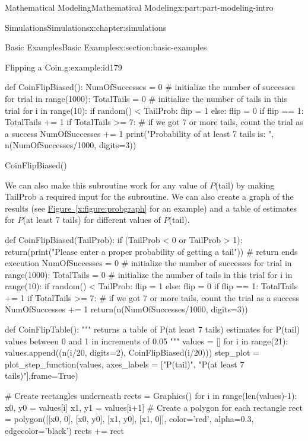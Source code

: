 \documentclass[oneside,10pt,]{book}
\newcommand{\xreffont}{\relax}
\numberwithin{equation}{section}
\begin{document}
\begin{partptx}{Mathematical Modeling}{}{Mathematical Modeling}{}{}{x:part:part-modeling-intro}
\begin{chapterptx}{Simulations}{}{Simulations}{}{}{x:chapter:simulations}
\begin{sectionptx}{Basic Examples}{}{Basic Examples}{}{}{x:section:basic-examples}
\begin{example}{Flipping a Coin.}{g:example:id179}
\begin{sageinput}
def CoinFlipBiased():
    NumOfSuccesses = 0 # initialize the number of successes
    for trial in range(1000):
        TotalTails = 0 # initialize the number of tails in this trial
        for i in range(10):
            if random() < TailProb:
                flip = 1
            else: flip = 0
            if flip == 1:
                TotalTails += 1
        if TotalTails >= 7: # if we got 7 or more tails, count the trial as a success
            NumOfSuccesses += 1
    print("Probability of at least 7 tails is: ", n(NumOfSuccesses/1000, digits=3))
\end{sageinput}
\begin{sageinput}
CoinFlipBiased()
\end{sageinput}
We can also make this subroutine work for any value of \(P\)(tail) by making TailProb a required input for the subroutine. We can also create a graph of the results (see \hyperref[x:figure:probgraph]{Figure~{\xreffont\ref{x:figure:probgraph}}} for an example) and a table of estimates for \(P\)(at least 7 tails) for different values of \(P\)(tail).%
\begin{sageinput}
def CoinFlipBiased(TailProb):
    if (TailProb < 0 or TailProb > 1):
        return(print("Please enter a proper probability of getting a tail")) # return ends execution
    NumOfSuccesses = 0 # initialize the number of successes
    for trial in range(1000):
        TotalTails = 0 # initialize the number of tails in this trial
        for i in range(10):
            if random() < TailProb:
                flip = 1
            else: flip = 0
            if flip == 1:
                TotalTails += 1
        if TotalTails >= 7: # if we got 7 or more tails, count the trial as a success
            NumOfSuccesses += 1
    return(n(NumOfSuccesses/1000, digits=3))
\end{sageinput}
\begin{sageinput}
def CoinFlipTable():
    """
    returns a table of P(at least 7 tails) estimates for
    P(tail) values between 0 and 1 in increments of 0.05
    """
    values = []
    for i in range(21):
        values.append((n(i/20, digits=2), CoinFlipBiased(i/20)))
    step_plot = plot_step_function(values, axes_labels = ["P(tail)", "P(at least 7 tails)"],frame=True)

    # Create rectangles underneath
    rects = Graphics()
    for i in range(len(values)-1):
        x0, y0 = values[i]
        x1, y1 = values[i+1]
    # Create a polygon for each rectangle
        rect = polygon([[x0, 0], [x0, y0], [x1, y0], [x1, 0]], 
                   color='red', alpha=0.3, edgecolor='black')
        rects += rect


\end{sageinput}
\end{example}
\end{sectionptx}
\end{chapterptx}
\end{partptx}
\end{document}
